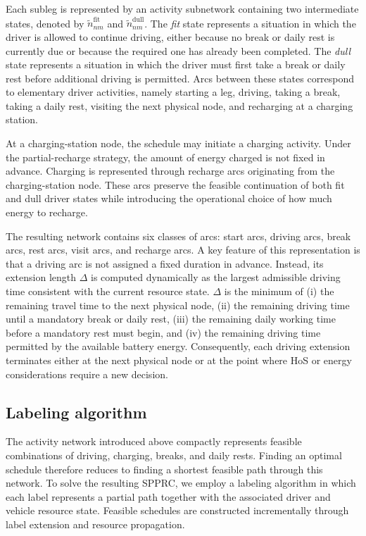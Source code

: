 \documentclass[3p,11pt,authoryear]{elsarticle}  %
\begin{document}
Each subleg is represented by an activity subnetwork containing two intermediate states, denoted by \(\tilde n_{nm}^{\mathrm{fit}}\) and \(\tilde n_{nm}^{\mathrm{dull}}\). The \emph{fit} state represents a situation in which the driver is allowed to continue driving, either because no break or daily rest is currently due or because the required one has already been completed. The \emph{dull} state represents a situation in which the driver must first take a break or daily rest before additional driving is permitted. Arcs between these states correspond to elementary driver activities, namely starting a leg, driving, taking a break, taking a daily rest, visiting the next physical node, and recharging at a charging station.

At a charging-station node, the schedule may initiate a charging activity. Under the partial-recharge strategy, the amount of energy charged is not fixed in advance. Charging is represented through recharge arcs originating from the charging-station node. These arcs preserve the feasible continuation of both fit and dull driver states while introducing the operational choice of how much energy to recharge.

The resulting network contains six classes of arcs: start arcs, driving arcs, break arcs, rest arcs, visit arcs, and recharge arcs. A key feature of this representation is that a driving arc is not assigned a fixed duration in advance. Instead, its extension length \(\Delta\) is computed dynamically as the largest admissible driving time consistent with the current resource state. \(\Delta\) is the minimum of (i) the remaining travel time to the next physical node, (ii) the remaining driving time until a mandatory break or daily rest, (iii) the remaining daily working time before a mandatory rest must begin, and (iv) the remaining driving time permitted by the available battery energy. Consequently, each driving extension terminates either at the next physical node or at the point where HoS or energy considerations require a new decision.


\subsection{Labeling algorithm}


The activity network introduced above compactly represents feasible combinations of driving, charging, breaks, and daily rests. Finding an optimal schedule therefore reduces to finding a shortest feasible path through this network. To solve the resulting SPPRC, we employ a labeling algorithm in which each label represents a partial path together with the associated driver and vehicle resource state. Feasible schedules are constructed incrementally through label extension and resource propagation.
\end{document}
